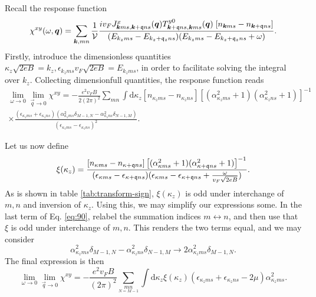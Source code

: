 Recall the response function
\begin{equation}
  \chi ^{xy} (\omega , \bm{q}) =
  \sum\limits_{\bm{k}, mn}^{}
  \frac{1}{\mathcal{V}}
  \frac{
    i v_F  J^x_{\bm{k} m s, \bm{k}+\mathfrak{q} n s}(\bm{q})
    T^{y 0}_{\bm{k}+\mathfrak{q} ns, \bm{k}ms}(\bm{q})
    \;
    [n_{\bm{k} m s}- n_{\bm{k}+\mathfrak{q} ns }]
  }{
    (E_{k_z m s} - E_{k_z + \mathfrak{q}_z ns} )
    (E_{k_z m s} - E_{k_z + \mathfrak{q}_z ns} +  \omega)
  }
  .
\end{equation}
Firstly, introduce the dimensionless quantities \( \kappa_z \sqrt{2 eB} = k_z, \epsilon_{k_z m s} v_F \sqrt{2 e B} = E_{k_z m s}  \), in order to facilitate solving the integral over \( k_z \).
Collecting dimensionfull quantities, the response function reads
\begin{multline}
  \label{eq:90}
\lim_{\omega \to 0} \lim_{\vec{q} \to 0} \chi^{xy} =
  -\frac{e^2 v_F B }{2 (2 \pi)^2}
  \sum\limits_{m n}^{}
  \int \mathrm{d} \kappa_z
  [n_{\kappa_z m s} - n_{\kappa_z n s}]
  [(\alpha_{\kappa_z m s}^2 + 1) (\alpha_{\kappa_z n s}^2 + 1)]^{-1}\\
  \times
  \frac{
    (\epsilon_{\kappa_z m s} + \epsilon_{\kappa_z n s})
    (\alpha_{\kappa_z m s}^2 \delta_{M-1, N} - \alpha_{\kappa_z n s}^2 \delta_{N-1, M})
  }{
    (\epsilon_{\kappa_z m s} - \epsilon_{\kappa_z n s})^2
  }.
\end{multline}

Let us now define
\begin{equation}
  \xi(\kappa_z) = \frac{[n_{\kappa ms} - n_{\kappa + \mathfrak{q} ns}]
  \left[ (\alpha_{\kappa ms}^2 + 1) (\alpha_{\kappa +\mathfrak{q} ns}^2 + 1) \right]^{-1}
  }{
    (\epsilon _{\kappa m s} - \epsilon _{\kappa +\mathfrak{q}ns} )
    (\epsilon _{\kappa m s} - \epsilon _{\kappa +\mathfrak{q}ns} + \frac{ \omega }{v_F \sqrt{2 e B  }} )
  }.
\end{equation}
As is shown in table \ref{tab:transform-sign}, \( \xi(\kappa_z) \) is odd under interchange of \( m,n \) and inversion of \( \kappa_z \).
Using this, we may simplify our expressions some.
In the last term of Eq. \eqref{eq:90}, relabel the summation indices \( m \leftrightarrow n \), and then use that \( \xi \) is odd under interchange of \( m,n \).
This renders the two terms equal, and we may consider
\[
\alpha_{\kappa_z m s}^2 \delta_{M-1,N} - \alpha_{\kappa_z n s}^2 \delta_{N-1, M} \to 2 \alpha_{\kappa_z m s}^2 \delta_{M-1, N}.
\]
The final expression is then
\begin{equation}
  \label{eq:91}
  \lim_{\omega \to 0} \lim_{\vec{q} \to 0} \chi^{xy} =
  -\frac{e^2 v_F B}{(2 \pi)^2} \sum\limits_{\underset{N=M-1}{mn}}
  \int \mathrm{d}\kappa_z \xi(\kappa_z)
  (\epsilon_{\kappa_z m s} + \epsilon_{\kappa_z n s} - 2 \mu) \alpha_{\kappa_z m s}^2.
\end{equation}

